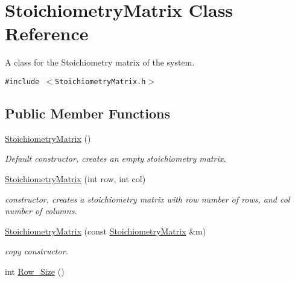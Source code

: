 \hypertarget{class_stoichiometry_matrix}{
\section{StoichiometryMatrix Class Reference}
\label{class_stoichiometry_matrix}
}
A class for the Stoichiometry matrix of the system.  


{\tt \#include $<$StoichiometryMatrix.h$>$}

\subsection*{Public Member Functions}
\begin{CompactItemize}
\item 
\hypertarget{class_stoichiometry_matrix_066c355cf54d5ec88bf55701823764ae}{
\hyperlink{class_stoichiometry_matrix_066c355cf54d5ec88bf55701823764ae}{StoichiometryMatrix} ()}
\label{class_stoichiometry_matrix_066c355cf54d5ec88bf55701823764ae}

\begin{CompactList}\small\item\em Default constructor, creates an empty stoichiometry matrix. \item\end{CompactList}\item 
\hyperlink{class_stoichiometry_matrix_dd6e1262d67ff54b8c9b2c1fadadf02f}{StoichiometryMatrix} (int row, int col)
\begin{CompactList}\small\item\em constructor, creates a stoichiometry matrix with row number of rows, and col number of columns. \item\end{CompactList}\item 
\hyperlink{class_stoichiometry_matrix_12024b0f318c252a071fe3d9f4909352}{StoichiometryMatrix} (const \hyperlink{class_stoichiometry_matrix}{StoichiometryMatrix} \&m)
\begin{CompactList}\small\item\em copy constructor. \item\end{CompactList}\item 
\hypertarget{class_stoichiometry_matrix_aef52ac6f7a760196cd326cc4687fe68}{
int \hyperlink{class_stoichiometry_matrix_aef52ac6f7a760196cd326cc4687fe68}{Row\_\-Size} ()}
\label{class_stoichiometry_matrix_aef52ac6f7a760196cd326cc4687fe68}


\end{CompactItemize}
